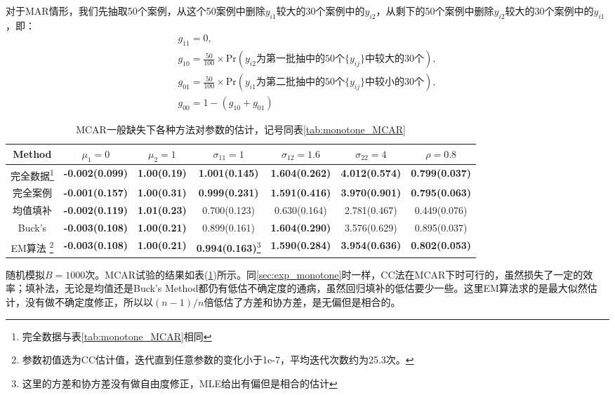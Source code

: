 \documentclass[aps,pre,12pt,preprint,onecolumn,showpacs,showkeys,AutoFakeBold]{revtex4-1}
\begin{document}
对于MAR情形，我们先抽取50个案例，从这个50案例中删除$y_{i1}$较大的30个案例中的$y_{i2}$，从剩下的50个案例中删除$y_{i2}$较大的30个案例中的$y_{i1}$，即：
\begin{eqnarray}
    g_{11}=0,\nonumber\\
    g_{10}=\frac{50}{100}\times\mathrm{Pr}(y_{i2}\text{为第一批抽中的50个$\{y_{ij}\}$中较大的30个}),\nonumber \\
    g_{01}=\frac{50}{100}\times\mathrm{Pr}(y_{i1}\text{为第二批抽中的50个$\{y_{ij}\}$中较小的30个}),\nonumber \\
    g_{00}=1-(g_{10}+g_{01})
\end{eqnarray}

\begin{table}[h]
    \caption{\label{tab:both_MCAR}%
    MCAR一般缺失下各种方法对参数的估计，记号同表\ref{tab:monotone_MCAR}}
    \begin{tabular}{|c|c|c|c|c|c|c|}
        \hline
        Method&$\mu _1=0$ &$\mu _2=1$&$\sigma _{11}=1$&$\sigma _{12}=1.6$&$\sigma _{22}=4$&$\rho=0.8$\\\hline
        完全数据\footnote{完全数据与表\ref{tab:monotone_MCAR}相同}&\textbf{-0.002(0.099)}&\textbf{1.00(0.19)}&\textbf{1.001(0.145)}&\textbf{1.604(0.262)}&\textbf{4.012(0.574)}&\textbf{0.799(0.037)}\\\hline
        完全案例&\textbf{-0.001(0.157)}&\textbf{1.00(0.31)}&\textbf{0.999(0.231)}&\textbf{1.591(0.416)}&\textbf{3.970(0.901)}&\textbf{0.795(0.063)}\\\hline
        均值填补&\textbf{-0.002(0.119)}&\textbf{1.01(0.23)}&0.700(0.123)&0.630(0.164)&2.781(0.467)&0.449(0.076)\\\hline
        Buck's&\textbf{-0.003(0.108)}&\textbf{1.00(0.21)}&0.899(0.161)&\textbf{1.604(0.290)}&3.576(0.629)&0.895(0.037)\\\hline
        EM算法
        \footnote{参数初值选为CC估计值，迭代直到任意参数的变化小于1e-7，平均迭代次数约为25.3次。}
        &\textbf{-0.003(0.108)}&\textbf{1.00(0.21)}&\textbf{0.994(0.163)}\footnote{这里的方差和协方差没有做自由度修正，MLE给出有偏但是相合的估计}&\textbf{1.590(0.284)}&\textbf{3.954(0.636)}&\textbf{0.802(0.053)}\\\hline
    \end{tabular}
\end{table}

随机模拟$B=1000$次。MCAR试验的结果如表(\ref{tab:both_MCAR})所示。同\ref{sec:exp_monotone}时一样，CC法在MCAR下时可行的，虽然损失了一定的效率；填补法，无论是均值还是Buck's Method都仍有低估不确定度的通病，虽然回归填补的低估要少一些。这里EM算法求的是最大似然估计，没有做不确定度修正，所以以$(n-1)/n$倍低估了方差和协方差，是无偏但是相合的。
\end{document}
